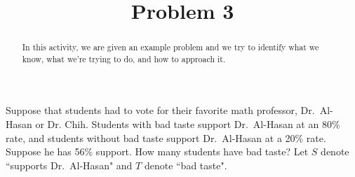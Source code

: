 \documentclass{ximera}
\title{Problem 3}
\begin{document}
      
\begin{abstract}
      
In this activity, we are given an example problem and we try to identify what we know, what we're trying to do, and how to approach it.
      
\end{abstract}
      
\maketitle
      
 
Suppose that students had to vote for their favorite math professor, Dr.\ Al-Hasan or Dr. Chih.  Students with bad taste support Dr.\ Al-Hasan at an 80\% rate, and students without bad taste support Dr.\ Al-Hasan at a 20\% rate.  Suppose he has 56\% support.  How many students have bad taste?  Let $S$ denote ``supports Dr.\ Al-Hasan" and $T$ denote ``bad taste".
\end{document}
